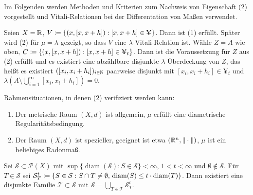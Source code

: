 \documentclass[a4paper,twoside,DIV15,BCOR12mm]{scrbook}
\DeclareMathOperator{\diam}{diam}
\begin{document}
Im Folgenden werden Methoden und Kriterien zum Nachweis von Eigenschaft (2) vorgestellt und  Vitali-Relationen bei der Differentation von Maßen verwendet.

\begin{beispiel}
Seien $X=\mathbb{R}$, $V\da \{(x,[x,x+h]): [x,x+h] \in \yen\}$. Dann ist (1) erfüllt. Später wird (2) für $\mu=\lambda$ gezeigt, so dass $V$ eine $\lambda$-Vitali-Relation ist. Wähle $Z = A$ wie oben, $C\da \{(x,[x,x+h]): [x,x+h] \in \yen_t\}$. Dann ist die Voraussetzung für $Z$ aus (2) erfüllt und es existiert eine abzählbare disjunkte $\lambda$-Überdeckung von $Z$, das heißt es existiert $([x_i,x_i+h_i])_{i\in\mathbb{N}}$ paarweise disjunkt mit $[x_i,x_i+h_i]\in \yen_t$ und $\lambda(A\setminus\bigcup_{i=1}^\infty [x_i,x_i+h_i])=0$.
\end{beispiel}

Rahmensituationen, in denen (2) verifiziert werden kann:
\begin{enumerate}
\item Der metrische Raum $(X,d)$ ist allgemein, $\mu$ erfüllt eine diametrische Regularitätsbedingung.
\item Der Raum $(X,d)$ ist spezieller, geeignet ist etwa $(\mathbb{R}^n,\|\cdot\|)$, $\mu$ ist ein beliebiges Radonmaß.
\end{enumerate}

\begin{satz}
\label{satz:2.5}
Sei $\mathcal S\subset\mathcal P(X)$ mit $\sup\{\diam(\mathcal S): S\in \mathcal S\}<\infty$, $1<t<\infty$ und $\emptyset\notin \mathcal S$. Für $T\in\mathcal S$ sei $\mathcal S_T^t \da\{S\in \mathcal S: S\cap T \ne \emptyset,\, \diam(S) \le t \cdot \diam(T)\}$. Dann existiert eine disjunkte Familie $\mathcal T\subset \mathcal S$ mit $\mathcal S = \bigcup_{T\in\mathcal T} \mathcal S_T^t$.
\end{satz}
\end{document}

